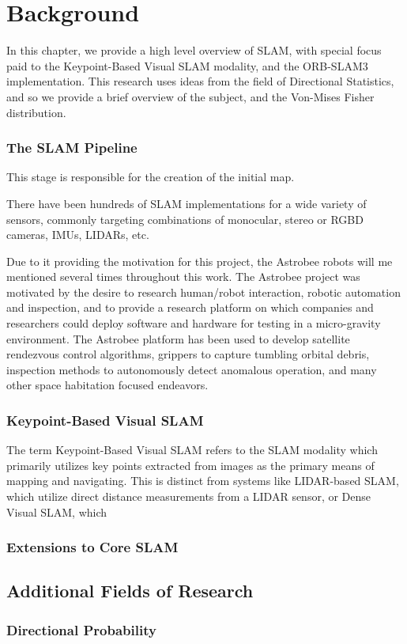 \section{Background}
\label{background}

In this chapter, we provide a high level overview of SLAM, with special focus paid to the Keypoint-Based Visual SLAM modality, and the ORB-SLAM3 implementation. This research uses ideas from the field of Directional Statistics, and so we provide a brief overview of the subject, and the Von-Mises Fisher distribution.



\subsubsection{The SLAM Pipeline}

This stage is responsible for the creation of the initial map.

There have been hundreds of SLAM implementations for a wide variety of sensors, commonly targeting combinations of monocular, stereo or RGBD cameras, IMUs, LIDARs, etc.

Due to it providing the motivation for this project, the Astrobee robots will me mentioned several times throughout this work. The Astrobee project was motivated by the desire to research human/robot interaction, robotic automation and inspection, and to provide a research platform on which companies and researchers could deploy software and hardware for testing in a micro-gravity environment. The Astrobee platform has been used to develop satellite rendezvous control algorithms, grippers to capture tumbling orbital debris, inspection methods to autonomously detect anomalous operation, and many other space habitation focused endeavors.

\subsubsection{Keypoint-Based Visual SLAM}

The term Keypoint-Based Visual SLAM refers to the SLAM modality which primarily utilizes key points extracted from images as the primary means of mapping and navigating. This is distinct from systems like LIDAR-based SLAM, which utilize direct distance measurements from a LIDAR sensor, or Dense Visual SLAM, which

\subsubsection{Extensions to Core SLAM}

\subsection{Additional Fields of Research}

\subsubsection{Directional Probability}